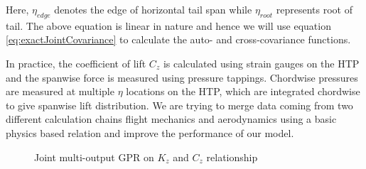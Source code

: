 Here, \(\eta_{edge}\) denotes the edge of horizontal tail span while \(\eta_{root}\) represents root of tail. The above equation is linear in nature and hence we will use equation \ref{eq:exactJointCovariance} to calculate the auto- and cross-covariance functions.

In practice, the coefficient of lift \(C_{z}\) is calculated using strain gauges on the HTP and the spanwise force is measured using pressure tappings. Chordwise pressures are measured at multiple \(\eta\) locations on the HTP, which are integrated chordwise to give spanwise lift distribution. We are trying to merge data coming from two different calculation chains flight mechanics and aerodynamics using a basic physics based relation and improve the performance of our model.

\begin{figure}[!ht]
  \centering
  \quad
  
\caption{Joint multi-output GPR on  \(K_{z}\) and \(C_{z}\) relationship}
  \label{fig:cztzRelationship}
\end{figure}

